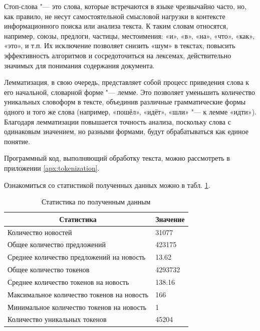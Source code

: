 \documentclass[coursework]{SCWorks}
\begin{document}
Стоп-слова "--- это слова, которые встречаются в языке чрезвычайно часто, но, как правило, не несут самостоятельной смысловой нагрузки в контексте информационного поиска или анализа текста. К таким словам относятся, например, союзы, предлоги, частицы, местоимения: «и», «в», «на», «что», «как», «это», и т.п. Их исключение позволяет снизить «шум» в текстах, повысить эффективность алгоритмов и сосредоточиться на лексемах, действительно значимых для понимания содержания документа.
  
Лемматизация, в свою очередь, представляет собой процесс приведения слова к его начальной, словарной форме "--- лемме. Это позволяет уменьшить количество уникальных словоформ в тексте, объединив различные грамматические формы одного и того же слова (например, «пошёл», «идёт», «шли» "--- к лемме «идти»). Благодаря лемматизации повышается точность анализа, поскольку слова с одинаковым значением, но разными формами, будут обрабатываться как единое понятие.

Программный код, выполняющий обработку текста, можно рассмотреть в приложении \ref{apx:tokenization}.

Ознакомиться со статистикой полученных данных можно в табл. \ref{table:preprocess}.
\begin{table}[!h]
    \centering
    \footnotesize
    \caption{Статистика по полученным данным}
    \begin{tabular}{|l|l|}
    \hline
    \multicolumn{1}{|c|}{\textbf{Статистика}}  & \multicolumn{1}{c|}{\textbf{Значение}} \\ \hline
    Количество новостей                        & 31077                                  \\ \hline
    Общее количество предложений               & 423175                                 \\ \hline
    Среднее количество предложений на новость  & 13.62                                  \\ \hline
    Общее количество токенов                   & 4293732                                \\ \hline
    Среднее количество токенов на новость      & 138.16                                 \\ \hline
    Максимальное количество токенов на новость & 166                                    \\ \hline
    Минимальное количество токенов на новость  & 1                                      \\ \hline
    Количество уникальных токенов              & 45204                                  \\ \hline
    \end{tabular} 
    \label{table:preprocess}
\end{table}
\end{document}
